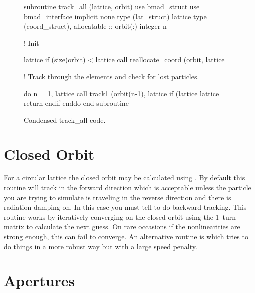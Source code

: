 {{{{{\begin{figure}[htb]
\begin{centering}
\small
\begin{listing}{1}
  subroutine track_all (lattice, orbit)
    use bmad_struct
    use bmad_interface
    implicit none
    type (lat_struct)  lattice
    type (coord_struct), allocatable :: orbit(:)
    integer n

  ! Init

    lattice%
    if (size(orbit) < lattice%
                    call reallocate_coord (orbit, lattice%

  ! Track through the elements and check for lost particles.

    do n = 1, lattice%
      call track1 (orbit(n-1), lattice%
      if (lattice%
        lattice%
        return
      endif
    enddo
  end subroutine
\end{listing}
\caption{Condensed track\_all code.}
\end{centering}
\label{f:track_all}
\end{figure}

\section{Closed Orbit}

For a circular lattice the closed orbit may be calculated using
. By default this routine will track in the
forward direction which is acceptable unless the particle you are
trying to simulate is traveling in the reverse direction and there is
radiation damping on. In this case you must tell
 to do backward tracking. This routine works by
iteratively converging on the closed orbit using the 1--turn matrix to
calculate the next guess. On rare occasions if the nonlinearities are
strong enough, this can fail to converge. An alternative routine is
 which tries to do things in a more
robust way but with a large speed penalty.

\section{Apertures}

}}}}}
